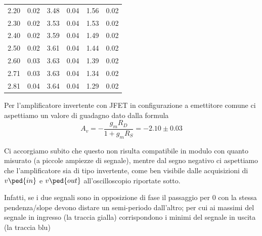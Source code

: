 \documentclass[10pt, a4paper, italian]{article}
\begin{document}
\begin{table}[H]
\begin{tabular}{cccccc}
2.20  & 0.02 & 3.48  & 0.04 & 1.56 & 0.02 \\
2.30  & 0.02 & 3.53  & 0.04 & 1.53 & 0.02 \\
2.40  & 0.02 & 3.59  & 0.04 & 1.49 & 0.02 \\
2.50  & 0.02 & 3.61  & 0.04 & 1.44 & 0.02 \\
2.60  & 0.03 & 3.63  & 0.04 & 1.39 & 0.02 \\
2.71  & 0.03 & 3.63  & 0.04 & 1.34 & 0.02 \\
2.81  & 0.04 & 3.64  & 0.04 & 1.29 & 0.02 \\
\bottomrule
\end{tabular}
\end{table}

Per l'amplificatore invertente con JFET in configurazione a emettitore comune
ci aspettiamo un valore di guadagno dato dalla formula
\begin{equation}\label{eq: Av}
A_v = -\frac{g_m R_D}{1 + g_m R_S} = -2.10 \pm 0.03
\end{equation}

Ci accorgiamo subito che questo non risulta compatibile in modulo con quanto
misurato (a piccole ampiezze di segnale), mentre dal segno negativo ci
aspettiamo che l'amplificatore sia di tipo invertente, come ben visibile dalle
acquisizioni di $v\ped{in}$ e $v\ped{out}$ all'oscilloscopio riportate sotto.

Infatti, se i due segnali sono in opposizione di fase il passaggio per 0 con
la stessa pendenza/slope devono distare un semi-periodo dall'altro; per cui ai
massimi del segnale in ingresso (la traccia gialla) corrispondono i minimi del
segnale in uscita (la traccia blu)
\end{document}
